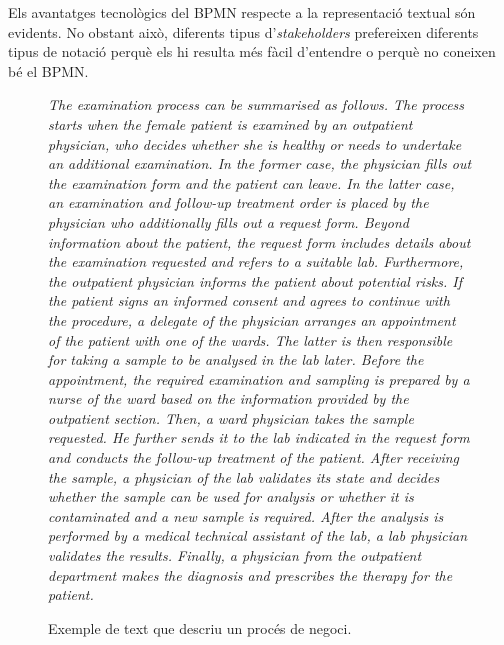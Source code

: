 \documentclass[10pt,a4paper]{article}
\begin{document}
Els avantatges tecnològics del BPMN respecte a la representació textual són evidents. No obstant això, diferents tipus d'\emph{stakeholders} prefereixen diferents tipus de notació perquè els hi resulta més fàcil d'entendre o perquè no coneixen bé el BPMN.

\begin{figure}
\centering
\begin{minipage}{0.9\textwidth}
\small\emph{{The examination process can be summarised as follows. The process starts
when the female patient is examined by an outpatient physician, who decides
whether she is healthy or needs to undertake an additional examination. In the
former case, the physician fills out the examination form and the patient can
leave. In the latter case, an examination and follow-up treatment order is placed
by the physician who additionally fills out a request form. Beyond information
about the patient, the request form includes details about the examination 
requested and refers to a suitable lab. Furthermore, the outpatient physician
informs the patient about potential risks. If the patient signs an informed consent
and agrees to continue with the procedure, a delegate of the physician
arranges an appointment of the patient with one of the wards. The latter is
then responsible for taking a sample to be analysed in the lab later. Before the
appointment, the required examination and sampling is prepared by a nurse of
the ward based on the information provided by the outpatient section. Then, a
ward physician takes the sample requested. He further sends it to the lab indicated
in the request form and conducts the follow-up treatment of the patient.
After receiving the sample, a physician of the lab validates its state and decides
whether the sample can be used for analysis or whether it is contaminated and
a new sample is required. After the analysis is performed by a medical technical
assistant of the lab, a lab physician validates the results. Finally, a physician
from the outpatient department makes the diagnosis and prescribes the therapy
for the patient.}}
    \end{minipage}
    \caption{Exemple de text que descriu un procés de negoci.}
    \label{fig:example_text}
\end{figure}
\end{document}
